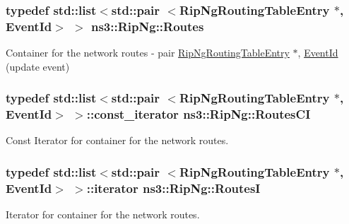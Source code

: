 \subsubsection[{\texorpdfstring{Routes}{Routes}}]{\setlength{\rightskip}{0pt plus 5cm}typedef {\bf std\+::list}$<$std\+::pair $<${\bf Rip\+Ng\+Routing\+Table\+Entry} $\ast$, {\bf Event\+Id}$>$ $>$ {\bf ns3\+::\+Rip\+Ng\+::\+Routes}\hspace{0.3cm}{\ttfamily [private]}}\hypertarget{classns3_1_1RipNg_a1d5addc59db17a00021a99e7d6ff9ccd}{}\label{classns3_1_1RipNg_a1d5addc59db17a00021a99e7d6ff9ccd}


Container for the network routes -\/ pair \hyperlink{classns3_1_1RipNgRoutingTableEntry}{Rip\+Ng\+Routing\+Table\+Entry} $\ast$, \hyperlink{classns3_1_1EventId}{Event\+Id} (update event) 

\subsubsection[{\texorpdfstring{Routes\+CI}{RoutesCI}}]{\setlength{\rightskip}{0pt plus 5cm}typedef {\bf std\+::list}$<$std\+::pair $<${\bf Rip\+Ng\+Routing\+Table\+Entry} $\ast$, {\bf Event\+Id}$>$ $>$\+::const\+\_\+iterator {\bf ns3\+::\+Rip\+Ng\+::\+Routes\+CI}\hspace{0.3cm}{\ttfamily [private]}}\hypertarget{classns3_1_1RipNg_a139e1c11e66791c62fa5ccf632723f95}{}\label{classns3_1_1RipNg_a139e1c11e66791c62fa5ccf632723f95}


Const Iterator for container for the network routes. 

\subsubsection[{\texorpdfstring{RoutesI}{RoutesI}}]{\setlength{\rightskip}{0pt plus 5cm}typedef {\bf std\+::list}$<$std\+::pair $<${\bf Rip\+Ng\+Routing\+Table\+Entry} $\ast$, {\bf Event\+Id}$>$ $>$\+::iterator {\bf ns3\+::\+Rip\+Ng\+::\+RoutesI}\hspace{0.3cm}{\ttfamily [private]}}\hypertarget{classns3_1_1RipNg_aa8bc6103d67089e1e3cd507936f94887}{}\label{classns3_1_1RipNg_aa8bc6103d67089e1e3cd507936f94887}


Iterator for container for the network routes. 

